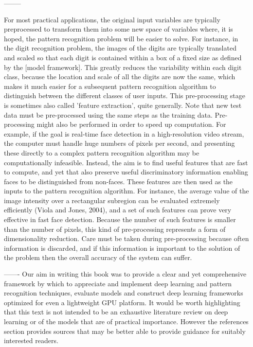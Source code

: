 \documentclass[7pt]{article}
\begin{document}
		 --------
		 
For most practical applications, the original input variables are typically preprocessed to transform them into some new space of variables where, it is hoped, the pattern recognition problem will be easier to solve. For instance, in the digit recognition problem, the images of the digits are typically translated and scaled so that each digit is contained within a box of a fixed size as defined by the [model framework]. This greatly reduces the variability within each digit class, because the location and scale of all the digits are now the same, which makes it much easier for a subsequent pattern recognition algorithm to distinguish between the different classes of user inputs. This pre-processing stage is sometimes also called 'feature extraction', quite generally. Note that new test data must be pre-processed using the same steps as the training data. Pre-processing might also be performed in order to speed up computation. For example, if the goal is real-time face detection in a high-resolution video stream, the computer must handle huge numbers of pixels per second, and presenting these directly to a complex pattern recognition algorithm may be computationally infeasible. Instead, the aim is to find useful features that are fast to compute, and yet that also preserve useful discriminatory information enabling faces to be distinguished from non-faces. These features are then used as the inputs to the pattern recognition algorithm. For instance, the average value of the image intensity over a rectangular subregion can be evaluated extremely efficiently (Viola and Jones, 2004), and a set of such features can prove very effective in fast face detection. Because the number of such features is smaller than the number of pixels, this kind of pre-processing represents a form of dimensionality reduction. Care must be taken during pre-processing because often information is discarded, and if this information is important to the solution of the problem then the overall accuracy of the system can suffer.
		 
		 -------
Our aim in writing this book was to provide a clear and yet comprehensive  framework by which to  appreciate and implement deep learning and pattern recognition techniques, evaluate models and construct deep learning frameworks optimized for even a lightweight GPU platform. It would be worth highlighting that this text is not intended to be an exhaustive literature review on deep learning or of the models that are of practical importance. However the  references section provides sources that may be better able to provide guidance for suitably interested readers. 
\end{document}

